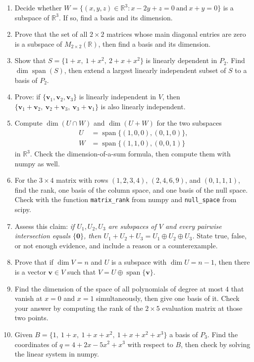 \begin{latihan}
\begin{enumerate}
  \item Decide whether $W=\{(x,y,z)\in\mathbb{R}^{3}:x-2y+z=0\ \text{and}\ x+y=0\}$
        is a subspace of $\mathbb{R}^{3}$. If so, find a basis and its dimension.
  \item Prove that the set of all $2\times2$ matrices whose main diagonal entries are zero
        is a subspace of $M_{2\times2}(\mathbb{R})$, then find a basis and its dimension.
  \item Show that $S=\{1+x,\ 1+x^{2},\ 2+x+x^{2}\}$ is linearly dependent in $P_{2}$.
        Find $\dim\operatorname{span}(S)$, then extend a largest linearly independent
        subset of $S$ to a basis of $P_{2}$.
  \item Prove: if $\{\mathbf{v}_{1},\mathbf{v}_{2},\mathbf{v}_{3}\}$ is linearly independent in
        $V$, then $\{\mathbf{v}_{1}+\mathbf{v}_{2},\ \mathbf{v}_{2}+\mathbf{v}_{3},\
        \mathbf{v}_{3}+\mathbf{v}_{1}\}$ is also linearly independent.
  \item Compute $\dim(U\cap W)$ and $\dim(U+W)$ for the two subspaces
        \begin{align*}
          U &= \operatorname{span}\{(1,0,0),(0,1,0)\}, \\
          W &= \operatorname{span}\{(1,1,0),(0,0,1)\}
        \end{align*}
        in $\mathbb{R}^{3}$. Check the dimension-of-a-sum formula, then compute them with numpy
        as well.
  \item For the $3\times4$ matrix with rows $(1,2,3,4)$, $(2,4,6,9)$, and $(0,1,1,1)$,
        find the rank, one basis of the column space, and one basis of the null space.
        Check with the function \texttt{matrix\_rank} from numpy and
        \texttt{null\_space} from scipy.
  \item Assess this claim: \emph{if $U_{1},U_{2},U_{3}$ are subspaces of $V$ and every pairwise
        intersection equals $\{\mathbf{0}\}$, then
        $U_{1}+U_{2}+U_{3}=U_{1}\oplus U_{2}\oplus U_{3}$.} State true, false, or not enough
        evidence, and include a reason or a counterexample.
  \item Prove that if $\dim V=n$ and $U$ is a subspace with $\dim U=n-1$, then there is a
        vector $\mathbf{v}\in V$ such that $V=U\oplus\operatorname{span}\{\mathbf{v}\}$.
  \item Find the dimension of the space of all polynomials of degree at most $4$ that vanish at
        $x=0$ and $x=1$ simultaneously, then give one basis of it. Check your answer by
        computing the rank of the $2\times5$ evaluation matrix at those two points.
  \item Given $B=\{1,\ 1+x,\ 1+x+x^{2},\ 1+x+x^{2}+x^{3}\}$ a basis of $P_{3}$. Find the
        coordinates of $q=4+2x-5x^{2}+x^{3}$ with respect to $B$, then check by solving the
        linear system in numpy.
\end{enumerate}


\end{latihan}
